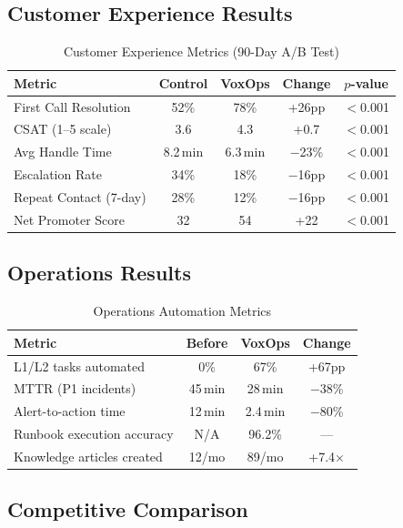 \documentclass[conference,10pt]{IEEEtran}
\begin{document}
\subsection{Customer Experience Results}

\begin{table}[!htbp]
\caption{Customer Experience Metrics (90-Day A/B Test)}
\label{tab:cx}
\centering\scriptsize
\begin{tabular}{@{}lcccc@{}}
\toprule
\textbf{Metric} & \textbf{Control} & \textbf{VoxOps} & \textbf{Change} & \textbf{$p$-value} \\
\midrule
First Call Resolution & 52\% & 78\% & +26pp & $<$0.001 \\
CSAT (1--5 scale) & 3.6 & 4.3 & +0.7 & $<$0.001 \\
Avg Handle Time & 8.2\,min & 6.3\,min & $-$23\% & $<$0.001 \\
Escalation Rate & 34\% & 18\% & $-$16pp & $<$0.001 \\
Repeat Contact (7-day) & 28\% & 12\% & $-$16pp & $<$0.001 \\
Net Promoter Score & 32 & 54 & +22 & $<$0.001 \\
\bottomrule
\end{tabular}
\end{table}

\subsection{Operations Results}

\begin{table}[!htbp]
\caption{Operations Automation Metrics}
\label{tab:ops}
\centering\scriptsize
\begin{tabular}{@{}lccc@{}}
\toprule
\textbf{Metric} & \textbf{Before} & \textbf{VoxOps} & \textbf{Change} \\
\midrule
L1/L2 tasks automated & 0\% & 67\% & +67pp \\
MTTR (P1 incidents) & 45\,min & 28\,min & $-$38\% \\
Alert-to-action time & 12\,min & 2.4\,min & $-$80\% \\
Runbook execution accuracy & N/A & 96.2\% & --- \\
Knowledge articles created & 12/mo & 89/mo & +7.4$\times$ \\
\bottomrule
\end{tabular}
\end{table}

\subsection{Competitive Comparison}
\end{document}

